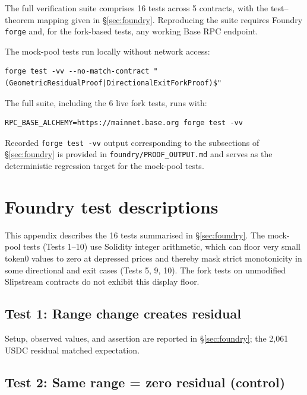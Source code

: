 \documentclass{manuscript}
\renewcommand{\arraystretch}{1.2}
\begin{document}

The full verification suite comprises 16 tests across 5 contracts, with the test--theorem mapping given in \S\ref{sec:foundry}. Reproducing the suite requires Foundry \texttt{forge} and, for the fork-based tests, any working Base RPC endpoint.

The mock-pool tests run locally without network access:

\begin{verbatim}
forge test -vv --no-match-contract "(GeometricResidualProof|DirectionalExitForkProof)$"
\end{verbatim}

The full suite, including the 6 live fork tests, runs with:

\begin{verbatim}
RPC_BASE_ALCHEMY=https://mainnet.base.org forge test -vv
\end{verbatim}

Recorded \texttt{forge test -vv} output corresponding to the subsections of \S\ref{sec:foundry} is provided in \texttt{foundry/PROOF\_OUTPUT.md} and serves as the deterministic regression target for the mock-pool tests.

\section{Foundry test descriptions}\label{app:foundry-detailed}

\renewcommand{\arraystretch}{1.0}
\setlength{\tabcolsep}{5pt}

This appendix describes the 16 tests summarised in \S\ref{sec:foundry}. The mock-pool tests (Tests 1--10) use Solidity integer arithmetic, which can floor very small token0 values to zero at depressed prices and thereby mask strict monotonicity in some directional and exit cases (Tests 5, 9, 10). The fork tests on unmodified Slipstream contracts do not exhibit this display floor.

\subsection{Test 1: Range change creates residual}\label{sec:foundry-mock-residual}

Setup, observed values, and assertion are reported in \S\ref{sec:foundry}; the 2{,}061 USDC residual matched expectation.

\subsection{Test 2: Same range = zero residual (control)}\label{sec:foundry-mock-control}
\end{document}
